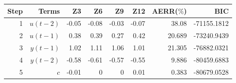 \begin{tabular}{rrrrrrrr}
Step & Terms & Z3 & Z6 & Z9 & Z12 & AERR($\%$) & BIC \\ 
\hline 
1 & $u(t-2)$ & -0.05 & -0.08 & -0.03 & -0.07 & 38.08 & -71155.1812 \\ 
2 & $u(t-1)$ & 0.38 & 0.39 & 0.27 & 0.42 & 20.689 & -73240.9439 \\ 
3 & $y(t-1)$ & 1.02 & 1.11 & 1.06 & 1.01 & 21.305 & -76882.0321 \\ 
4 & $y(t-2)$ & -0.58 & -0.61 & -0.57 & -0.55 & 9.886 & -80459.6883 \\ 
5 & $c$ & -0.01 & 0 & 0 & 0.01 & 0.383 & -80679.0528 \\ 
\hline 
\end{tabular}